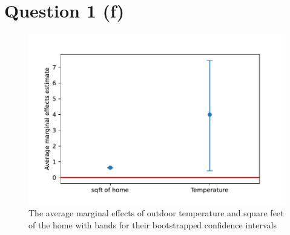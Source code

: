 \documentclass{article}
\begin{document}
\section{Question 1 (f)}
\begin{figure}[ht]
    \centering
    \includegraphics[scale = 0.7]{amebootstrappedCI.pdf}
    \caption{The average marginal effects of outdoor temperature and square feet of the home with
bands for their bootstrapped confidence intervals}
    \label{fig:amebootstrappedCI}
\end{figure}
\end{document}
